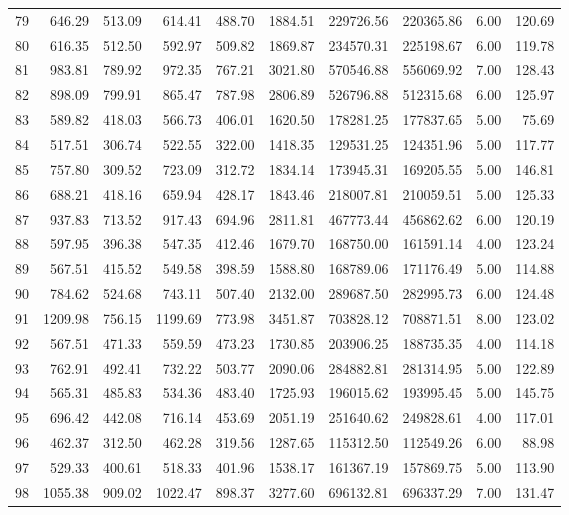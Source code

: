 \begin{tabular}{lrrrrrrrrr}
79 & 646.29 & 513.09 & 614.41 & 488.70 & 1884.51 & 229726.56 & 220365.86 & 6.00 & 120.69 \\
80 & 616.35 & 512.50 & 592.97 & 509.82 & 1869.87 & 234570.31 & 225198.67 & 6.00 & 119.78 \\
81 & 983.81 & 789.92 & 972.35 & 767.21 & 3021.80 & 570546.88 & 556069.92 & 7.00 & 128.43 \\
82 & 898.09 & 799.91 & 865.47 & 787.98 & 2806.89 & 526796.88 & 512315.68 & 6.00 & 125.97 \\
83 & 589.82 & 418.03 & 566.73 & 406.01 & 1620.50 & 178281.25 & 177837.65 & 5.00 & 75.69 \\
84 & 517.51 & 306.74 & 522.55 & 322.00 & 1418.35 & 129531.25 & 124351.96 & 5.00 & 117.77 \\
85 & 757.80 & 309.52 & 723.09 & 312.72 & 1834.14 & 173945.31 & 169205.55 & 5.00 & 146.81 \\
86 & 688.21 & 418.16 & 659.94 & 428.17 & 1843.46 & 218007.81 & 210059.51 & 5.00 & 125.33 \\
87 & 937.83 & 713.52 & 917.43 & 694.96 & 2811.81 & 467773.44 & 456862.62 & 6.00 & 120.19 \\
88 & 597.95 & 396.38 & 547.35 & 412.46 & 1679.70 & 168750.00 & 161591.14 & 4.00 & 123.24 \\
89 & 567.51 & 415.52 & 549.58 & 398.59 & 1588.80 & 168789.06 & 171176.49 & 5.00 & 114.88 \\
90 & 784.62 & 524.68 & 743.11 & 507.40 & 2132.00 & 289687.50 & 282995.73 & 6.00 & 124.48 \\
91 & 1209.98 & 756.15 & 1199.69 & 773.98 & 3451.87 & 703828.12 & 708871.51 & 8.00 & 123.02 \\
92 & 567.51 & 471.33 & 559.59 & 473.23 & 1730.85 & 203906.25 & 188735.35 & 4.00 & 114.18 \\
93 & 762.91 & 492.41 & 732.22 & 503.77 & 2090.06 & 284882.81 & 281314.95 & 5.00 & 122.89 \\
94 & 565.31 & 485.83 & 534.36 & 483.40 & 1725.93 & 196015.62 & 193995.45 & 5.00 & 145.75 \\
95 & 696.42 & 442.08 & 716.14 & 453.69 & 2051.19 & 251640.62 & 249828.61 & 4.00 & 117.01 \\
96 & 462.37 & 312.50 & 462.28 & 319.56 & 1287.65 & 115312.50 & 112549.26 & 6.00 & 88.98 \\
97 & 529.33 & 400.61 & 518.33 & 401.96 & 1538.17 & 161367.19 & 157869.75 & 5.00 & 113.90 \\
98 & 1055.38 & 909.02 & 1022.47 & 898.37 & 3277.60 & 696132.81 & 696337.29 & 7.00 & 131.47 \\

\end{tabular}
